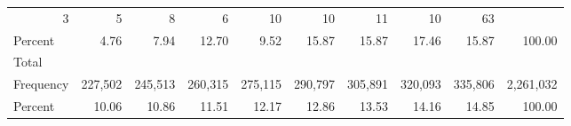 \documentclass{article}
\begin{document}
\begin{table}[!h]
\begin{tabular}{llllllllll}
  \multicolumn{1}{|r}{3} &
  \multicolumn{1}{r}{5} &
  \multicolumn{1}{r}{8} &
  \multicolumn{1}{r}{6} &
  \multicolumn{1}{r}{10} &
  \multicolumn{1}{r}{10} &
  \multicolumn{1}{r}{11} &
  \multicolumn{1}{r}{10} &
  \multicolumn{1}{r}{63} \\
\multicolumn{1}{l}{\hspace{2em}Percent} &
  \multicolumn{1}{|r}{4.76} &
  \multicolumn{1}{r}{7.94} &
  \multicolumn{1}{r}{12.70} &
  \multicolumn{1}{r}{9.52} &
  \multicolumn{1}{r}{15.87} &
  \multicolumn{1}{r}{15.87} &
  \multicolumn{1}{r}{17.46} &
  \multicolumn{1}{r}{15.87} &
  \multicolumn{1}{r}{100.00} \\
\multicolumn{1}{l}{\hspace{1em}Total} &
  \multicolumn{1}{|r}{} &
  \multicolumn{1}{r}{} &
  \multicolumn{1}{r}{} &
  \multicolumn{1}{r}{} &
  \multicolumn{1}{r}{} &
  \multicolumn{1}{r}{} &
  \multicolumn{1}{r}{} &
  \multicolumn{1}{r}{} &
  \multicolumn{1}{r}{} \\
\multicolumn{1}{l}{\hspace{2em}Frequency} &
  \multicolumn{1}{|r}{227,502} &
  \multicolumn{1}{r}{245,513} &
  \multicolumn{1}{r}{260,315} &
  \multicolumn{1}{r}{275,115} &
  \multicolumn{1}{r}{290,797} &
  \multicolumn{1}{r}{305,891} &
  \multicolumn{1}{r}{320,093} &
  \multicolumn{1}{r}{335,806} &
  \multicolumn{1}{r}{2,261,032} \\
\multicolumn{1}{l}{\hspace{2em}Percent} &
  \multicolumn{1}{|r}{10.06} &
  \multicolumn{1}{r}{10.86} &
  \multicolumn{1}{r}{11.51} &
  \multicolumn{1}{r}{12.17} &
  \multicolumn{1}{r}{12.86} &
  \multicolumn{1}{r}{13.53} &
  \multicolumn{1}{r}{14.16} &
  \multicolumn{1}{r}{14.85} &
  \multicolumn{1}{r}{100.00} \\
\cline{1-10}
\end{tabular}
\end{table}
\end{document}
